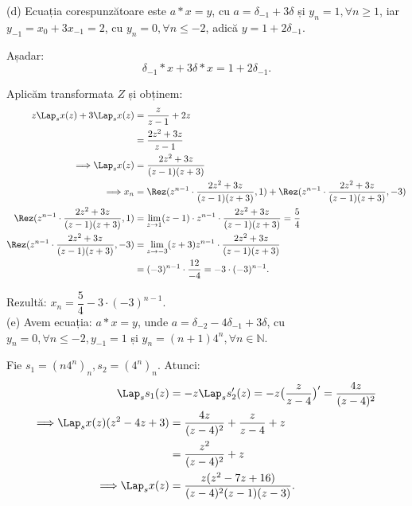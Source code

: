 (d) Ecuația corespunzătoare este $a \ast x = y$, cu $a = \delta_{-1} + 3 \delta$ și 
$y_n = 1, \forall n \geq 1$, iar $y_{-1} = x_0 + 3 x_{-1} = 2$, cu 
$y_n = 0, \forall n \leq -2$, adică $y = 1 + 2 \delta_{-1}$.

Așadar: 
\[
  \delta_{-1} \ast x + 3 \delta \ast x = 1 + 2 \delta_{-1}.
\]

Aplicăm transformata $Z$ și obținem:
\begin{align*}
  z \Lap_s x(z) + 3 \Lap_s x(z) &= \dfrac{z}{z-1} + 2z \\
                                &= \dfrac{2z^2 + 3z}{z-1} \\
  \Longrightarrow \Lap_s x(z) &= \dfrac{2z^2 + 3z}{(z-1)(z+3)} \\
  \Longrightarrow x_n &= \Rez(z^{n-1} \cdot \dfrac{2z^2 + 3z}{(z-1)(z+3)}, 1) + 
                        \Rez (z^{n-1} \cdot \dfrac{2z^2 + 3z}{(z-1)(z+3)}, -3) \\
  \Rez(z^{n-1} \cdot \dfrac{2z^2 + 3z}{(z-1)(z+3)}, 1) &= \lim_{z \to 1} (z-1) 
                                                         \cdot z^{n-1} \cdot \dfrac{2z^2 + 3z}{(z-1)(z+3)} = \dfrac{5}{4} \\
  \Rez(z^{n-1} \cdot \dfrac{2z^2 + 3z}{(z-1)(z+3)}, -3) 
                                &= \lim_{z \to -3} (z+3) z^{n-1} \cdot \dfrac{2z^2 + 3z}{(z-1)(z+3)} \\
                                &= (-3)^{n-1} \cdot \dfrac{12}{-4} = -3 \cdot (-3)^{n-1}.	                              
\end{align*}

Rezultă: $x_n = \dfrac{5}{4} - 3 \cdot (-3)^{n-1}$. \\

(e) Avem ecuația: $a \ast x = y$, unde 
$a = \delta_{-2} - 4 \delta_{-1} + 3 \delta$, cu 
$y_n = 0, \forall n \leq -2, y_{-1} = 1$ și 
$y_n = (n+1)4^n, \forall n \in \mathbb{N}$.

Fie $s_1 = (n4^n)_n, s_2 = (4^n)_n$. Atunci:
\begin{align*}
  \Lap_s s_1(z) &= -z \Lap_s s_2^{\prime}(z) 
                  = - z \big( \dfrac{z}{z-4} \big)^{\prime} = \dfrac{4z}{(z-4)^2} \\
  \Longrightarrow \Lap_s x(z)(z^2 - 4z + 3) 
                &= \dfrac{4z}{(z-4)^2} + \dfrac{z}{z-4} + z \\
                &= \dfrac{z^2}{(z-4)^2} + z \\
  \Longrightarrow  \Lap_s x(z) &= \dfrac{z(z^2 - 7z + 16)}{(z-4)^2 (z-1) (z-3)}.
\end{align*}


